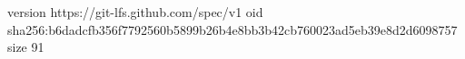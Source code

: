 version https://git-lfs.github.com/spec/v1
oid sha256:b6dadcfb356f7792560b5899b26b4e8bb3b42cb760023ad5eb39e8d2d6098757
size 91
